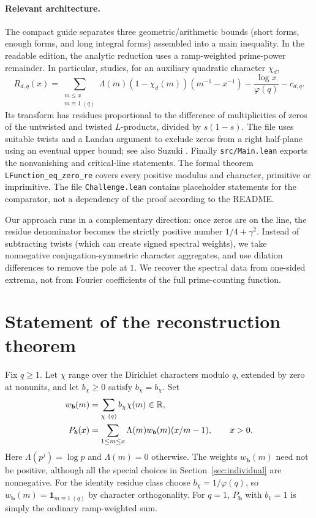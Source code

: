 \documentclass[11pt]{article}
\theoremstyle{remark}\newtheorem{remark}[theorem]{Remark}
\newcommand{\bb}{\boldsymbol b}
\begin{document}
\paragraph{Relevant architecture.} The compact guide separates three geometric/arithmetic bounds (short forms, enough forms, and long integral forms) assembled into a main inequality. In the readable edition, the analytic reduction uses a ramp-weighted prime-power remainder. In particular,  studies, for an auxiliary quadratic character $\chi_d$,
\[
 R_{d,q}(x)=\sum_{\substack{m\le x\\m\equiv1\ (q)}}\Lambda(m)(1-\chi_d(m))
 (m^{-1}-x^{-1})-\frac{\log x}{\varphi(q)}-c_{d,q}.
\]
Its transform has residues proportional to the difference of multiplicities of zeros of the untwisted and twisted $L$-products, divided by $s(1-s)$. The file  uses suitable twists and a Landau argument to exclude zeros from a right half-plane using an eventual upper bound; see also Suzuki \cite{suzuki}. Finally \texttt{src/Main.lean} exports the nonvanishing and critical-line statements. The formal theorem \texttt{LFunction\_eq\_zero\_re} covers every positive modulus and character, primitive or imprimitive. The file \texttt{Challenge.lean} contains placeholder statements for the comparator, not a dependency of the proof according to the README.

Our approach runs in a complementary direction: once zeros are on the line, the residue denominator becomes the strictly positive number $1/4+\gamma^2$. Instead of subtracting twists (which can create signed spectral weights), we take nonnegative conjugation-symmetric character aggregates, and use dilation differences to remove the pole at $1$. We recover the spectral data from one-sided extrema, not from Fourier coefficients of the full prime-counting function.

\section{Statement of the reconstruction theorem}
Fix $q\ge1$. Let $\chi$ range over the Dirichlet characters modulo $q$, extended by zero at nonunits, and let $b_\chi\ge0$ satisfy $b_{\bar\chi}=b_\chi$. Set
\begin{align}
 w_{\bb}(m)&=\sum_{\chi\ (q)} b_\chi\chi(m)\in\R,\\
 P_{\bb}(x)&=\sum_{1\le m\le x}\Lambda(m)w_{\bb}(m)(x/m-1),\qquad x>0.
 \label{eq:prime}
\end{align}
Here $\Lambda(p^j)=\log p$ and $\Lambda(m)=0$ otherwise. The weights $w_{\bb}(m)$ need not be positive, although all the special choices in Section~\ref{sec:individual} are nonnegative. For the identity residue class choose $b_\chi=1/\varphi(q)$, so $w_{\bb}(m)=\mathbf 1_{m\equiv1\ (q)}$ by character orthogonality. For $q=1$, $P_{\bb}$ with $b_1=1$ is simply the ordinary ramp-weighted sum.
\end{document}
